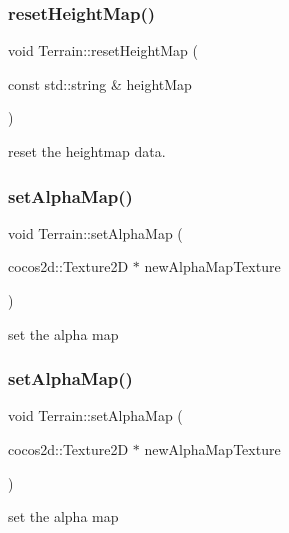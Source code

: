 \subsubsection{\texorpdfstring{reset\+Height\+Map()}{resetHeightMap()}\hspace{0.1cm}{\footnotesize\ttfamily [2/2]}}
{\footnotesize\ttfamily void Terrain\+::reset\+Height\+Map (\begin{DoxyParamCaption}\item[{const std\+::string \&}]{height\+Map }\end{DoxyParamCaption})}

reset the heightmap data. \mbox{\label{classTerrain_a10a40e89dd343591a43ab2a1069cef54}} 
\subsubsection{\texorpdfstring{set\+Alpha\+Map()}{setAlphaMap()}\hspace{0.1cm}{\footnotesize\ttfamily [1/2]}}
{\footnotesize\ttfamily void Terrain\+::set\+Alpha\+Map (\begin{DoxyParamCaption}\item[{cocos2d\+::\+Texture2D $\ast$}]{new\+Alpha\+Map\+Texture }\end{DoxyParamCaption})}

set the alpha map \mbox{\label{classTerrain_a10a40e89dd343591a43ab2a1069cef54}} 
\subsubsection{\texorpdfstring{set\+Alpha\+Map()}{setAlphaMap()}\hspace{0.1cm}{\footnotesize\ttfamily [2/2]}}
{\footnotesize\ttfamily void Terrain\+::set\+Alpha\+Map (\begin{DoxyParamCaption}\item[{cocos2d\+::\+Texture2D $\ast$}]{new\+Alpha\+Map\+Texture }\end{DoxyParamCaption})}

set the alpha map \mbox{\label{classTerrain_ab2a8b176050b693a801f5a73f1d3b6e0}} 
